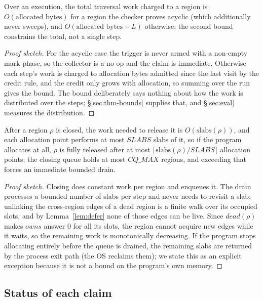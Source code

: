 \begin{theorem}
\label{thm:amortized}
Over an execution, the total traversal work charged to a region is
$O(\text{allocated bytes})$ for a region the checker proves acyclic (which additionally never
sweeps), and $O(\text{allocated bytes} + L)$ otherwise; the second bound constrains the total, not a
single step.
\end{theorem}
\begin{proof}[Proof sketch]
For the acyclic case the trigger is never armed with a non-empty mark phase, so the collector is a
no-op and the claim is immediate.
Otherwise each step's work is charged to allocation bytes admitted since the last visit by the credit
rule, and the credit only grows with allocation, so summing over the run gives the bound.
The bound deliberately says nothing about how the work is distributed over the steps; \S\ref{sec:thm-bounds}
supplies that, and \S\ref{sec:eval} measures the distribution.
\end{proof}

\begin{theorem}
\label{thm:progress}
After a region $\rho$ is closed, the work needed to release it is $O(\text{slabs}(\rho))$, and each
allocation point performs at most $\mathit{SLABS}$ slabs of it, so if the program allocates at all,
$\rho$ is fully released after at most $\lceil \text{slabs}(\rho)/\mathit{SLABS} \rceil$ allocation
points; the closing queue holds at most $\mathit{CQ\_MAX}$ regions, and exceeding that forces an
immediate bounded drain.
\end{theorem}
\begin{proof}[Proof sketch]
Closing does constant work per region and enqueues it.
The drain processes a bounded number of slabs per step and never needs to revisit a slab: unlinking
the cross-region edges of a dead region is a finite walk over its occupied slots, and by
Lemma~\ref{lem:defer} none of those edges can be live.
Since $\mathit{dead}(\rho)$ makes $\mathit{owns}$ answer $0$ for all its slots, the region cannot
acquire new edges while it waits, so the remaining work is monotonically decreasing.
If the program stops allocating entirely before the queue is drained, the remaining slabs are
returned by the process exit path (the OS reclaims them); we state this as an explicit exception
because it is not a bound on the program's own memory.
\end{proof}

\subsection{Status of each claim}
\label{sec:formal-status}

